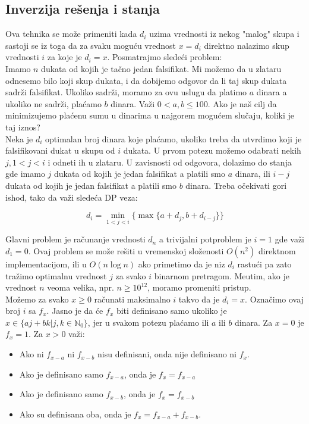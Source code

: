 \subsection{Inverzija re\v senja i stanja}

Ova tehnika se mo\v ze primeniti kada $d_i$ uzima vrednosti iz nekog "malog" skupa i sastoji se iz toga da za svaku mogu\' cu vrednost $x = d_i$ direktno nalazimo skup vrednosti $i$ za koje je $d_i = x$. Posmatrajmo slede\' ci problem:
\\

Imamo $n$ dukata od kojih je ta\v cno jedan falsifikat. Mi mo\v zemo da u zlataru odnesemo bilo koji skup dukata, i da dobijemo odgovor da li taj skup dukata sadr\v zi falsifikat. Ukoliko sadr\v zi, moramo za ovu uslugu da platimo $a$ dinara a ukoliko ne sadr\v zi, pla\' camo $b$ dinara. Va\v zi $0 < a,b \leq 100$. Ako je na\v s cilj da minimizujemo pla\' cenu sumu u dinarima u najgorem mogu\' cem slu\v caju, koliki je taj iznos?
\\

Neka je $d_i$ optimalan broj dinara koje pla\' camo, ukoliko treba da utvrdimo koji je falsifikovani dukat u skupu od $i$ dukata. U prvom potezu mo\v zemo odabrati nekih $j, 1 < j < i$ i odneti ih u zlataru. U zavisnosti od odgovora, dolazimo do stanja gde imamo $j$ dukata od kojih je jedan falsifikat a platili smo $a$ dinara, ili $i-j$ dukata od kojih je jedan falsifikat a platili smo $b$ dinara. Treba o\v cekivati gori ishod, tako da va\v zi slede\' ca DP veza:

\begin{equation} \label{eq:dukati}
	d_i = \min_{1 < j < i} \{ \max\{ a + d_j, b + d_{i-j} \} \}
\end{equation}

Glavni problem je ra\v cunanje vrednosti $d_n$ a trivijalni potproblem je $i = 1$ gde va\v zi $d_1 = 0$. Ovaj problem se mo\v ze re\v siti u vremenskoj slo\v zenosti $O(n^2)$ direktnom implementacijom, ili u $O(n \log n)$ ako primetimo da je niz $d_i$ rastu\' ci pa zato tra\v zimo optimalnu vrednost $j$ za svako $i$ binarnom pretragom. Me\dj utim, ako je vrednost $n$ veoma velika, npr. $n \geq 10^{12}$, moramo promeniti pristup.
\\

Mo\v zemo za svako $x \geq 0$ ra\v cunati maksimalno $i$ takvo da je $d_i = x$. Ozna\v cimo ovaj broj $i$ sa $f_x$. Jasno je da \' ce $f_x$ biti definisano samo ukoliko je $x \in \{ aj+bk | j,k \in \mathbb{N}_0 \}$, jer u svakom potezu pla\' camo ili $a$ ili $b$ dinara. Za $x=0$ je $f_x = 1$. Za $x > 0$ va\v zi:
\begin{itemize}
\item Ako ni $f_{x-a}$ ni $f_{x-b}$ nisu definisani, onda nije definisano ni $f_x$.
\item Ako je definisano samo $f_{x-a}$, onda je $f_x = f_{x-a}$
\item Ako je definisano samo $f_{x-b}$, onda je $f_x = f_{x-b}$
\item Ako su definisana oba, onda je $f_x = f_{x-a} + f_{x-b}$.
\end{itemize}
